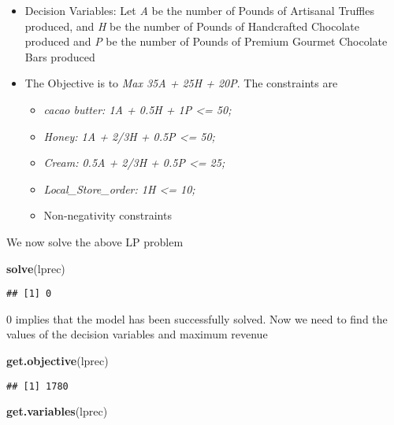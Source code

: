 \documentclass[
]{article}
\newenvironment{Shaded}{\begin{snugshade}}{\end{snugshade}}
\newcommand{\FunctionTok}[1]{\textcolor[rgb]{0.13,0.29,0.53}{\textbf{#1}}}
\newcommand{\NormalTok}[1]{#1}
\providecommand{\tightlist}{%
  \setlength{\itemsep}{0pt}\setlength{\parskip}{0pt}}
\begin{document}
\begin{itemize}
\tightlist
\item
  Decision Variables: Let \emph{A} be the number of Pounds of Artisanal
  Truffles produced, and \emph{H} be the number of Pounds of Handcrafted
  Chocolate produced and \emph{P} be the number of Pounds of Premium
  Gourmet Chocolate Bars produced
\item
  The Objective is to \emph{Max 35A + 25H + 20P}. The constraints are

  \begin{itemize}
  \tightlist
  \item
    \emph{cacao butter: 1A + 0.5H + 1P \textless= 50;}
  \item
    \emph{Honey: 1A + 2/3H + 0.5P \textless= 50;}
  \item
    \emph{Cream: 0.5A + 2/3H + 0.5P \textless= 25;}
  \item
    \emph{Local\_Store\_order: 1H \textless= 10;}
  \item
    Non-negativity constraints
  \end{itemize}
\end{itemize}

We now solve the above LP problem

\begin{Shaded}
\begin{Highlighting}[]
\FunctionTok{solve}\NormalTok{(lprec)}
\end{Highlighting}
\end{Shaded}

\begin{verbatim}
## [1] 0
\end{verbatim}

0 implies that the model has been successfully solved. Now we need to
find the values of the decision variables and maximum revenue

\begin{Shaded}
\begin{Highlighting}[]
\FunctionTok{get.objective}\NormalTok{(lprec)}
\end{Highlighting}
\end{Shaded}

\begin{verbatim}
## [1] 1780
\end{verbatim}

\begin{Shaded}
\begin{Highlighting}[]
\FunctionTok{get.variables}\NormalTok{(lprec)}
\end{Highlighting}
\end{Shaded}
\end{document}

